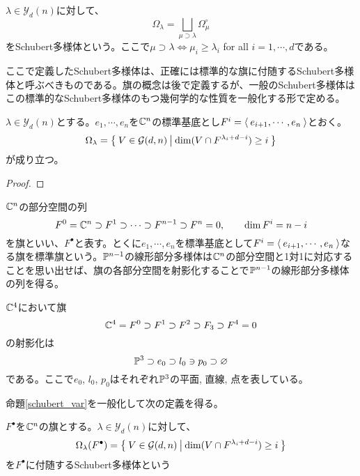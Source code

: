 \documentclass{ltjsreport}
\begin{document}
\begin{defin}[標準的な旗に付随するShubert多様体]
  $\lambda\in\mathcal{Y}_d(n)$に対して、
  \[
  \Omega_\lambda=\bigsqcup_{\mu\supset\lambda}\Omega^\circ_\mu
  \]
  をSchubert多様体という。ここで$\mu\supset\lambda\Leftrightarrow \mu_i\geq \lambda_i$ for all $i=1,\cdots,d$である。
\end{defin}

ここで定義したSchubert多様体は、正確には標準的な旗に付随するSchubert多様体と呼ぶべきものである。旗の概念は後で定義するが、一般のSchubert多様体はこの標準的なSchubert多様体のもつ幾何学的な性質を一般化する形で定める。

\begin{prop}\label{schubert_var}
  $\lambda\in\mathcal{Y}_d(n)$とする。$e_1,\cdots,e_n$を$\mathbb{C}^n$の標準基底とし$F^i=\langle\:e_{i+1},\cdots,e_n\:\rangle$とおく。
  \[
  \Omega_{\lambda}=\left\{\:V\in\mathcal{G}(d,n)\:\middle|\:\dim(V\cap F^{\lambda_i+d-i})\geq i\:\right\}  
  \]
  が成り立つ。
\end{prop}

\begin{proof}
  
\end{proof}

\begin{defin}
  $\mathbb{C}^n$の部分空間の列
  \[
  F^0=\mathbb{C}^n\supset F^1\supset \cdots\supset F^{n-1}\supset F^n=0,\qquad \dim F^i=n-i  
  \]
  を旗といい、$F^\bullet$と表す。とくに$e_1,\cdots,e_n$を標準基底として$F^i=\langle\:e_{i+1},\cdots,e_n\:\rangle$なる旗を標準旗という。$\mathbb{P}^{n-1}$の線形部分多様体は$\mathbb{C}^n$の部分空間と1対1に対応することを思い出せば、旗の各部分空間を射影化することで$\mathbb{P}^{n-1}$の線形部分多様体の列を得る。
\end{defin}

\begin{eg}
  $\mathbb{C}^4$において旗
  \[
  \mathbb{C}^4=F^0\supset F^1\supset F^2\supset F_3\supset F^4=0  
  \]
  の射影化は
  \[
  \mathbb{P}^3\supset e_0\supset l_0\owns p_0\supset \varnothing  
  \]
  である。ここで$e_0$, $l_0$, $p_0$はそれぞれ$\mathbb{P}^3$の平面, 直線, 点を表している。
\end{eg}

命題\ref{schubert_var}を一般化して次の定義を得る。

\begin{defin}
  $F^\bullet$を$\mathbb{C}^n$の旗とする。$\lambda\in\mathcal{Y}_d(n)$に対して、
  \[
  \Omega_\lambda(F^\bullet)=\left\{\:V\in\mathcal{G}(d,n)\:\middle|\:\dim(V\cap F^{\lambda_i+d-i})\geq i\:\right\}
  \]
  を$F^\bullet$に付随するSchubert多様体という
\end{defin}
\end{document}
